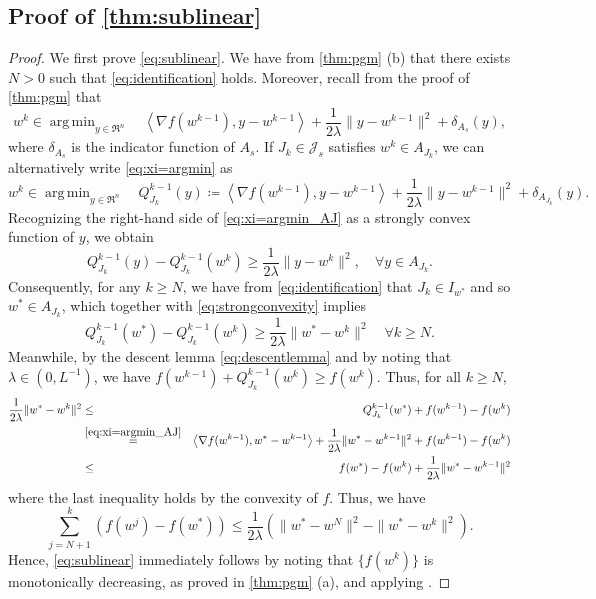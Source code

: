 \documentclass{article}
\theoremstyle{plain}
\theoremstyle{definition}
\theoremstyle{remark}
\newcommand{\J}{\mathcal{J}}
\newcommand\inner[2]{\left\langle #1, #2 \right\rangle}
\DeclareMathOperator*{\argmin}{arg\,min}
\begin{document}
\subsection{Proof of \cref{thm:sublinear}}
\begin{proof} 
We first prove \cref{eq:sublinear}.
We have from \cref{thm:pgm} (b) that there exists $N>0$ such that 
\cref{eq:identification} holds. Moreover, recall from 
the proof of \cref{thm:pgm} that 
	\begin{equation}
	\label{eq:xi=argmin}
	w^{k} \in \argmin _{y\in\Re^n}\quad \inner{ \nabla f(w^{k-1})}{y-w^{k-1}} 
	+ 
	\frac{1}{2\lambda}\|y-w^{k-1}\|^2 + \delta_{A_s} (y),
	\end{equation}
where $\delta_{A_s}$ is the indicator function of $A_s$. If
$J_k\in\J_s$ satisfies $w^k\in A_{J_k}$, we can alternatively write
\cref{eq:xi=argmin} as
	\begin{equation}
		\label{eq:xi=argmin_AJ}
	w^{k} \in \argmin _{y\in\Re^n}\quad Q_{J_k}^{k-1}(y) \coloneqq \inner{ \nabla 
	f(w^{k-1})}{y-w^{k-1}} 
	+ 
	\frac{1}{2\lambda}\|y-w^{k-1}\|^2 + \delta_{A_{J_k}} (y).
	\end{equation}
Recognizing the right-hand side of \cref{eq:xi=argmin_AJ} as a strongly convex 
function of $y$, we obtain
	\begin{equation}
	\label{eq:strongconvexity}
	Q_{J_k}^{k-1}(y) - Q_{J_k}^{k-1}(w^k) \geq 
	\frac{1}{2\lambda}\|y-w^k\|^2, \quad 
	\forall y\in A_{J_k}.
	\end{equation}
Consequently, for any $k\geq N$, we have from \cref{eq:identification} that 
${J_k}\in I_{w^*}$ and so $w^* \in A_{J_k}$, which together with
\cref{eq:strongconvexity} implies
	\begin{equation}
	\label{eq:strongconvexity_star}
	Q_{J_k}^{k-1}(w^*) - Q_{J_k}^{k-1}(w^k) \geq 
	\frac{1}{2\lambda}\|w^*-w^k\|^2 \quad \forall 
	k\geq N. 
	\end{equation}
Meanwhile, by the descent lemma \cref{eq:descentlemma} and by noting that 
$\lambda\in(0,L^{-1})$, we have $f(w^{k-1}) + 
Q_{J_k}^{k-1}(w^k) \geq f(w^k)$. Thus, for all $k\geq N$,
	\begin{eqnarray*}
	\frac{1}{2\lambda}\|w^*-w^k\|^2 &  \leq &
 	Q_{J_k}^{k-1}(w^*) + f(w^{k-1}) - f(w^k) \\
 	& \overset{\cref{eq:xi=argmin_AJ}}{=} & \inner{ \nabla 
 		f(w^{k-1})}{w^*-w^{k-1}} 
 	+ 
 	\frac{1}{2\lambda}\|w^*-w^{k-1}\|^2 + f(w^{k-1}) - f(w^k)  \\
 	& \leq & f(w^*) - f(w^k) + \frac{1}{2\lambda}\|w^*-w^{k-1}\|^2 
 	\end{eqnarray*}
 where the last inequality holds by the convexity of $f$. Thus, we have
 	\begin{equation}
 	\sum_{j=N+1}^k \left( f(w^j) - f(w^*) \right) \leq \frac{1}{2\lambda} 
 	\left( \|w^*-w^{N}\|^2  - \|w^*-w^{k}\|^2 \right).
 	\end{equation}
Hence, \cref{eq:sublinear} immediately follows by noting that $\{ f(w^k)\}$ 
is monotonically decreasing, as proved in \cref{thm:pgm} (a), and
applying \cite[Lemma~1]{LeeW19a}.


\end{proof}
\end{document}
